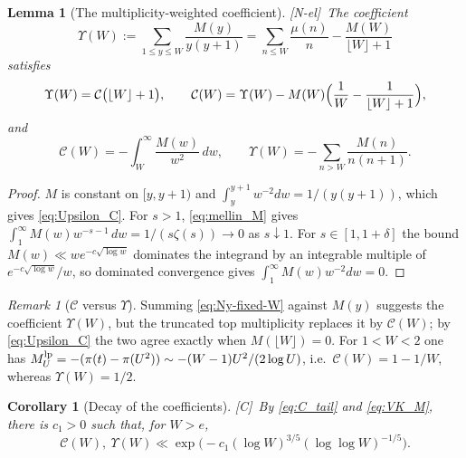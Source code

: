\documentclass[11pt,reqno]{amsart}
\numberwithin{equation}{section}
\theoremstyle{plain}
\newtheorem{lemma}[theorem]{Lemma}
\newtheorem{corollary}[theorem]{Corollary}
\theoremstyle{definition}
\theoremstyle{remark}
\newtheorem{remark}[theorem]{Remark}
\newcommand{\Cc}{\mathcal{C}}
\newcommand{\tagNE}{\textup{[N-el]}}
\newcommand{\tagC}{\textup{[C]}}
\begin{document}
\begin{lemma}[The multiplicity-weighted coefficient]
\label{lem:copy-weight-coefficient}
\tagNE\ The coefficient
\begin{equation}
\label{eq:Upsilon_def}
  \Upsilon(W):=\sum_{1\le y\le W}\frac{M(y)}{y(y+1)}
  =\sum_{n\le W}\frac{\mu(n)}n-\frac{M(W)}{\lfloor W\rfloor+1}
\end{equation}
satisfies
\begin{equation}
\label{eq:Upsilon_C}
  \Upsilon(W)=\Cc\bigl(\lfloor W\rfloor+1\bigr),\qquad
  \Cc(W)=\Upsilon(W)-M(W)\Bigl(\frac1W-\frac1{\lfloor W\rfloor+1}\Bigr),
\end{equation}
and
\begin{equation}
\label{eq:C_tail}
  \Cc(W)=-\int_W^\infty\frac{M(w)}{w^2}\,dw,\qquad
  \Upsilon(W)=-\sum_{n>W}\frac{M(n)}{n(n+1)}.
\end{equation}
\end{lemma}

\begin{proof}
$M$ is constant on $[y,y+1)$ and $\int_y^{y+1}w^{-2}dw=1/(y(y+1))$, which
gives \eqref{eq:Upsilon_C}. For $s>1$, \eqref{eq:mellin_M} gives
$\int_1^\infty M(w)w^{-s-1}\,dw=1/(s\zeta(s))\to0$ as $s\downarrow1$. For
$s\in[1,1+\delta]$ the bound $M(w)\ll we^{-c\sqrt{\log w}}$ dominates the
integrand by an integrable multiple of $e^{-c\sqrt{\log w}}/w$, so dominated
convergence gives $\int_1^\infty M(w)w^{-2}dw=0$.
\end{proof}

\begin{remark}[$\Cc$ versus $\Upsilon$]
\label{rem:C-vs-Upsilon}
Summing \eqref{eq:Ny-fixed-W} against $M(y)$ suggests the coefficient
$\Upsilon(W)$, but the truncated top multiplicity replaces it by $\Cc(W)$; by
\eqref{eq:Upsilon_C} the two agree exactly when $M(\lfloor W\rfloor)=0$. For
$1<W<2$ one has $M^{\rm lp}_U=-(\pi(t)-\pi(U^2))\sim-(W-1)U^2/(2\log U)$, i.e.\
$\Cc(W)=1-1/W$, whereas $\Upsilon(W)=1/2$.
\end{remark}

\begin{corollary}[Decay of the coefficients]
\label{cor:AR-VK}
\tagC\ By \eqref{eq:C_tail} and \eqref{eq:VK_M}, there is $c_1>0$ such that, for $W>e$,
\begin{equation}
\label{eq:AR-VK}
  \Cc(W),\ \Upsilon(W)\ll\exp\bigl(-c_1(\log W)^{3/5}(\log\log W)^{-1/5}\bigr).
\end{equation}
\end{corollary}
\end{document}
